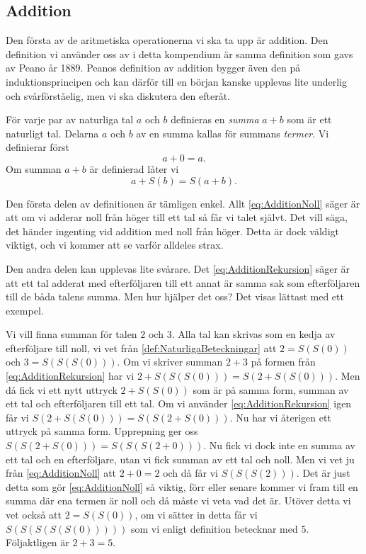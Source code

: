 \subsection{Addition}
Den första av de aritmetiska operationerna vi ska ta upp är addition.
Den definition vi använder oss av i detta kompendium är samma definition som
gavs av Peano år 1889.
Peanos definition av addition bygger även den på induktionsprincipen och kan
därför till en början kanske upplevas lite underlig och svårförståelig, men vi
ska diskutera den efteråt.
\begin{definition}[Summa]\label{def:NaturligaSumma}\index{\(+\)}
  För varje par av naturliga tal \(a\) och \(b\) definieras en \emph{summa}
  \(a+b\) som är ett naturligt tal.
  Delarna \(a\) och \(b\) av en summa kallas för summans \emph{termer}.
  Vi definierar först
  \begin{equation}
    \label{eq:AdditionNoll}
    a+0 = a.
  \end{equation}
  Om summan \(a+b\) är definierad låter vi
  \begin{equation}
    \label{eq:AdditionRekursion}
    a+S(b) = S(a+b).
  \end{equation}
\end{definition}
Den första delen av definitionen är tämligen enkel.
Allt \cref{eq:AdditionNoll} säger är att om vi adderar noll från höger till
ett tal så får vi talet självt.
Det vill säga, det händer ingenting vid addition med noll från höger.
Detta är dock väldigt viktigt, och vi kommer att se varför alldeles strax. 

Den andra delen kan upplevas lite svårare.
Det \cref{eq:AdditionRekursion} säger är att ett tal adderat med efterföljaren
till ett annat är samma sak som efterföljaren till de båda talens summa.
Men hur hjälper det oss?
Det visas lättast med ett exempel.
\begin{example}
  Vi vill finna summan för talen \(2\) och \(3\).
  Alla tal kan skrivas som en kedja av efterföljare till noll, vi vet från
  \cref{def:NaturligaBeteckningar} att \(2=S(S(0))\) och \(3=S(S(S(0)))\).
  Om vi skriver summan \(2+3\) på formen från
  \cref{eq:AdditionRekursion} har vi \(2+S(S(S(0)))=S(2+S(S(0)))\).
  Men då fick vi ett nytt uttryck \(2+S(S(0))\) som är på samma form, summan
  av ett tal och efterföljaren till ett tal.
  Om vi använder \cref{eq:AdditionRekursion} igen får vi
  \(S(2+S(S(0)))=S(S(2+S(0)))\).
  Nu har vi återigen ett uttryck på samma form.
  Upprepning ger oss \(S(S(2+S(0)))=S(S(S(2+0)))\).
  Nu fick vi dock inte en summa av ett tal och en efterföljare, utan
  vi fick summan av ett tal och noll.
  Men vi vet ju från \cref{eq:AdditionNoll} att \(2+0=2\) och då får vi
  \(S(S(S(2)))\).
  Det är just detta som gör \cref{eq:AdditionNoll} så viktig, förr eller
  senare kommer vi fram till en summa där ena termen är noll och då måste vi
  veta vad det är.
  Utöver detta vi vet också att \(2=S(S(0))\), om vi sätter in detta får vi
  \(S(S(S(S(S(0)))))\) som vi enligt definition betecknar med \(5\).
  Följaktligen är \(2+3=5\).
\end{example}

